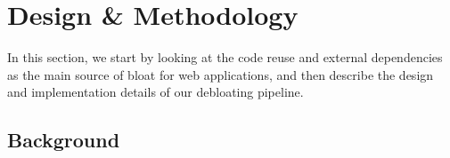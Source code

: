 
\chapter{Design \& Methodology\label{ch:usage}}
In this section, we start by looking at the code reuse and external dependencies as the main source of bloat for web applications, and then describe the design and implementation details of our debloating pipeline.
\section{Background}

